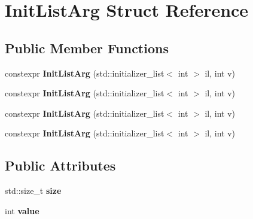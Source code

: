 \hypertarget{struct_init_list_arg}{}\section{Init\+List\+Arg Struct Reference}
\label{struct_init_list_arg}
\subsection*{Public Member Functions}
\begin{DoxyCompactItemize}
\item 
\mbox{\label{struct_init_list_arg_af4b06dd217737b4432bc123a1ae53bc4}} 
constexpr {\bfseries Init\+List\+Arg} (std\+::initializer\+\_\+list$<$ int $>$ il, int v)
\item 
\mbox{\label{struct_init_list_arg_af4b06dd217737b4432bc123a1ae53bc4}} 
constexpr {\bfseries Init\+List\+Arg} (std\+::initializer\+\_\+list$<$ int $>$ il, int v)
\item 
\mbox{\label{struct_init_list_arg_af4b06dd217737b4432bc123a1ae53bc4}} 
constexpr {\bfseries Init\+List\+Arg} (std\+::initializer\+\_\+list$<$ int $>$ il, int v)
\item 
\mbox{\label{struct_init_list_arg_af4b06dd217737b4432bc123a1ae53bc4}} 
constexpr {\bfseries Init\+List\+Arg} (std\+::initializer\+\_\+list$<$ int $>$ il, int v)
\end{DoxyCompactItemize}
\subsection*{Public Attributes}
\begin{DoxyCompactItemize}
\item 
\mbox{\label{struct_init_list_arg_abe284dbe60e663521d0375f64274d371}} 
std\+::size\+\_\+t {\bfseries size}
\item 
\mbox{\label{struct_init_list_arg_a677360c43a7ca7cf0ec3bc79952bd803}} 
int {\bfseries value}
\end{DoxyCompactItemize}


